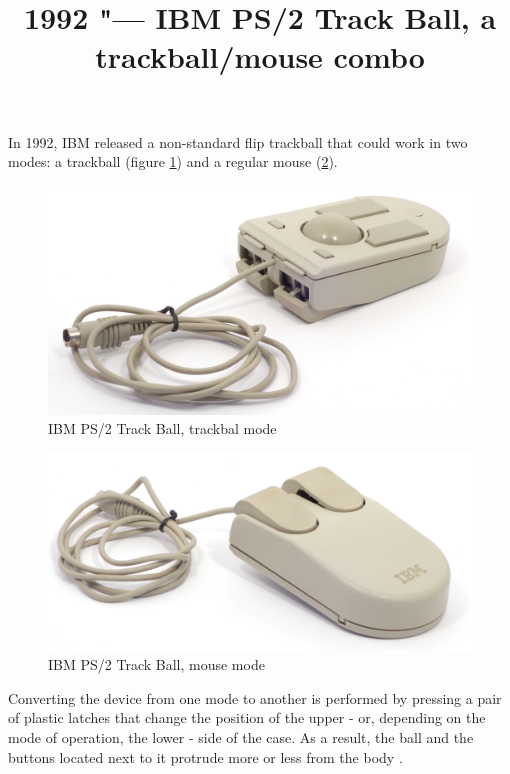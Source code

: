 \documentclass[11pt, a4paper]{article}
\begin{document}
\title{1992 "--- IBM PS/2 Track Ball, a trackball/mouse combo}
\date{}
\maketitle
{}
In 1992, IBM released a non-standard flip trackball that could work in two modes: a trackball (figure \ref{fig:IBMConvertibleTrackball}) and a regular mouse (\ref{fig:IBMConvertibleMouse}).

\begin{figure}[h]
    \centering
    \includegraphics[scale=0.5]{1992_ibm_convertible/picball_60}
    \caption{IBM PS/2 Track Ball, trackbal mode}
    \label{fig:IBMConvertibleTrackball}
\end{figure}

\begin{figure}[h]
    \centering
    \includegraphics[scale=0.5]{1992_ibm_convertible/picmouse_60}
    \caption{IBM PS/2 Track Ball, mouse mode}
    \label{fig:IBMConvertibleMouse}
\end{figure}

Converting the device from one mode to another is performed by pressing a pair of plastic latches that change the position of the upper - or, depending on the mode of operation, the lower - side of the case. As a result, the ball and the buttons located next to it protrude more or less from the body \cite{mouses}.
\end{document}
